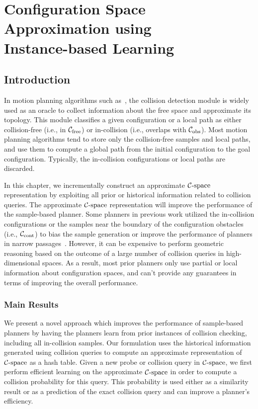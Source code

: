 \chapter[Configuration Space Approximation using Instance-based Learning]{Configuration Space Approximation \mbox{using} \\ Instance-based Learning} 
\label{chp:IBL}

\section{Introduction}
In motion planning algorithms such as~\cite{Kavraki96, Kuffner00}, the collision detection module is widely used as an oracle to collect information about the free space and approximate its topology. This module classifies a given configuration or a local path as either collision-free (i.e., in $\mathcal C_{\text{free}}$) or in-collision (i.e., overlaps with $\mathcal C_{\text{obs}}$). Most motion planning algorithms tend to store only the collision-free samples and local paths, and use them to compute a global path from the initial configuration to the goal configuration. Typically, the in-collision configurations or local paths are discarded.

In this chapter, we incrementally construct an approximate $\mathcal C\text{-space}$ representation by exploiting all prior or historical information related to collision queries. The approximate $\mathcal C\text{-space}$ representation will improve the performance of the sample-based planner. Some planners in previous work utilized the in-collision configurations or the samples near the boundary of the configuration obstacles (i.e., $\mathcal C_\text{cont}$) to bias the sample generation or improve the performance of planners in narrow passages~\cite{Boor:1999:ICRA,Jory:2011:IROS,Rodriguez:2006,Zheng:2005}. However, it can be expensive to perform geometric reasoning based on the outcome of a large number of collision queries in high-dimensional spaces. As a result, most prior planners only use partial or local information about configuration spaces, and can't provide any guarantees in terms of improving the overall performance.
\subsection{Main Results}
We present a novel approach which improves the performance of sample-based planners by having the planners learn from prior instances of collision checking, including all in-collision samples. Our formulation uses the historical information generated using collision queries to compute an approximate representation of $\mathcal C\text{-space}$ as a hash table. Given a new probe or collision query in $\mathcal C\text{-space}$, we first perform efficient learning on the approximate $\mathcal C\text{-space}$ in order to compute a collision probability for this query. This probability is used either as a similarity result or as a prediction of the exact collision query and can improve a planner's efficiency.

